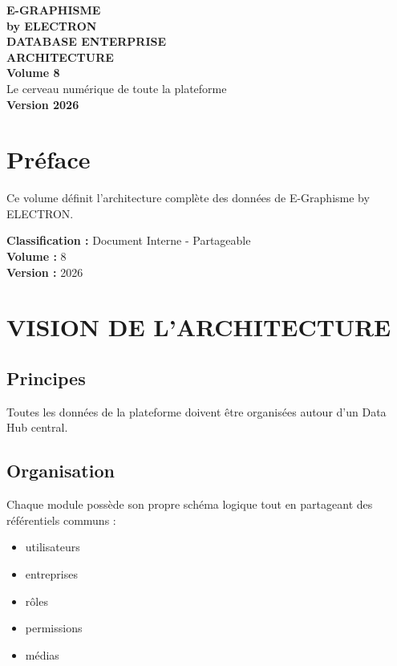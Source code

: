 \documentclass[12pt,a4paper,oneside]{book}
\begin{document}
\begin{titlepage}
\thispagestyle{empty}
\begin{center}
\vspace*{2cm}
{\Huge\bfseries\color{bleuIA}E-GRAPHISME}\\[0.3cm]
{\LARGE\bfseries\color{violet}by ELECTRON}\\[2cm]
\vspace{2cm}
{\huge\bfseries\color{noir}DATABASE ENTERPRISE}\\[0.3cm]
{\huge\bfseries\color{noir}ARCHITECTURE}\\[1cm]
{\Large\bfseries\color{cyan}Volume 8}\\[3cm]
\vspace{2cm}
{\Large\color{gris}Le cerveau numérique de toute la plateforme}\\[3cm]
{\Large\bfseries\color{or}Version 2026}\\[2cm]
\vfill
\end{center}
\end{titlepage}

\frontmatter

\chapter*{Préface}
Ce volume définit l'architecture complète des données de E-Graphisme by ELECTRON.

\bigskip
\textbf{Classification :} Document Interne - Partageable\\
\textbf{Volume :} 8\\
\textbf{Version :} 2026

\tableofcontents

\mainmatter

\chapter{VISION DE L'ARCHITECTURE}

\section{Principes}
Toutes les données de la plateforme doivent être organisées autour d'un Data Hub central.

\section{Organisation}
Chaque module possède son propre schéma logique tout en partageant des référentiels communs :
\begin{itemize}
\item utilisateurs
\item entreprises
\item rôles
\item permissions
\item médias
\end{itemize}
\end{document}
